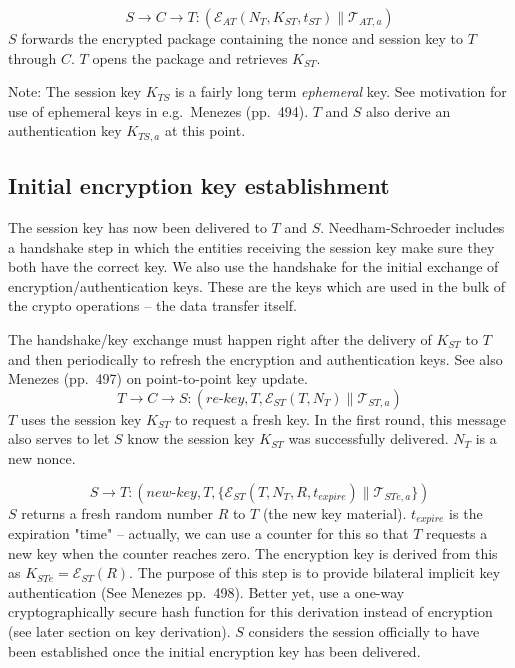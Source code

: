 \documentclass[10pt,a4paper]{article}
\begin{document}
\[
S \rightarrow C \rightarrow T: (\mathcal{E}_{AT}(N_T,K_{ST},t_{ST}) \parallel \mathcal{T}_{AT,a})
\]
$S$ forwards the encrypted package containing the nonce and session key to $T$ through $C$. $T$ opens the package and retrieves $K_{ST}$. 

Note: The session key $K_{TS}$ is a fairly long term \textit{ephemeral} key. See motivation for use of ephemeral keys in e.g.\ Menezes (pp.\ 494). $T$ and $S$ also derive an authentication key $K_{TS,a}$ at this point.

\subsection{Initial encryption key establishment}

The session key has now been delivered to $T$ and $S$. Needham-Schroeder includes a handshake step in which the entities receiving the session key make sure they both have the correct key. We also use the handshake for the initial exchange of encryption/authentication keys. These are the keys which are used in the bulk of the crypto operations -- the data transfer itself.

The handshake/key exchange must happen right after the delivery of $K_{ST}$ to $T$ and then periodically to refresh the encryption and authentication keys. See also Menezes (pp.\ 497) on point-to-point key update.
\[
T \rightarrow C \rightarrow S: (\textit{re-key},T,\mathcal{E}_{ST}(T,N_T) \parallel \mathcal{T}_{ST,a})
\]
$T$ uses the session key $K_{ST}$ to request a fresh key. In the first round, this message also serves to let $S$ know the session key $K_{ST}$ was successfully delivered. $N_T$ is a new nonce.

\[
S \rightarrow T: (\textit{new-key},T, \{ \mathcal{E}_{ST}(T,N_T,R,t_{expire}) \parallel \mathcal{T}_{STe,a} \} )
\]
$S$ returns a fresh random number $R$ to $T$ (the new key material). $t_{expire}$ is the expiration "time" -- actually, we can use a counter for this so that $T$ requests a new key when the counter reaches zero. The encryption key is derived from this as $K_{STe}=\mathcal{E}_{ST}(R)$. The purpose of this step is to provide bilateral implicit key authentication (See Menezes pp.\ 498). Better yet, use a one-way cryptographically secure hash function for this derivation instead of encryption (see later section on key derivation). $S$ considers the session officially to have been established once the initial encryption key has been delivered.

\end{document}
